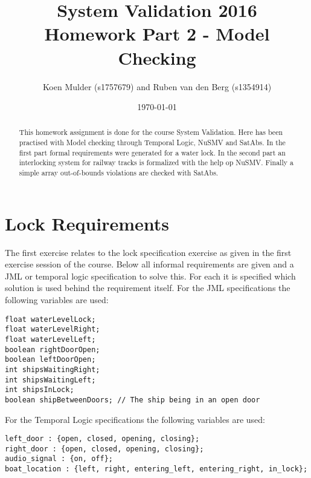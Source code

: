 \documentclass[a4paper]{article}
\title{System Validation 2016 \\ Homework Part 2 - Model Checking}
\author{Koen Mulder (s1757679) and Ruben van den Berg (s1354914)}
\date{\today}
\begin{document}
	\maketitle
	
	\begin{abstract}
		This homework assignment is done for the course System Validation. Here has been practised with Model checking through Temporal Logic, NuSMV and SatAbs. In the first part formal requirements were generated for a water lock. In the second part an interlocking system for railway tracks is formalized with the help op NuSMV. Finally a simple array out-of-bounds violations are checked with SatAbs. 
	\end{abstract}
	
	\section{Lock Requirements}
	The first exercise relates to the lock specification exercise as given in the first exercise session of the course. Below all informal requirements are given and a JML or temporal logic specification to solve this. For each it is specified which solution is used behind the requirement itself.
	For the JML specifications the following variables are used:
	\begin{lstlisting}
float waterLevelLock;
float waterLevelRight;
float waterLevelLeft;
boolean rightDoorOpen;
boolean leftDoorOpen;
int shipsWaitingRight;
int shipsWaitingLeft;
int shipsInLock;
boolean shipBetweenDoors; // The ship being in an open door
	\end{lstlisting}
	For the Temporal Logic specifications the following variables are used:
	\begin{lstlisting}
left_door : {open, closed, opening, closing};
right_door : {open, closed, opening, closing};
audio_signal : {on, off};
boat_location : {left, right, entering_left, entering_right, in_lock};
	\end{lstlisting}
\end{document}
